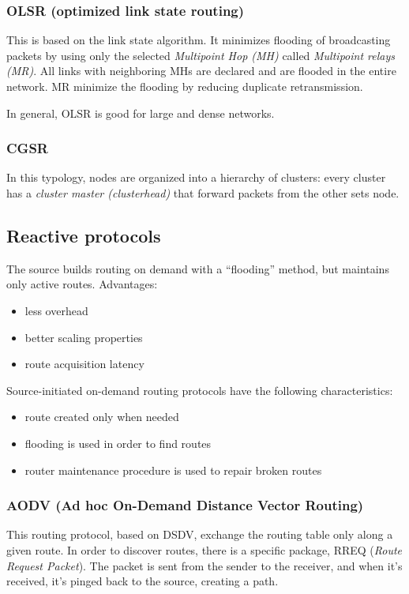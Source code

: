 \subsubsection{OLSR (optimized link state routing)}

This is based on the link state algorithm. It minimizes flooding of broadcasting
packets by using only the selected \textit{Multipoint Hop (MH)} called
\textit{Multipoint relays (MR)}. All links with neighboring MHs are declared and
are flooded in the entire network. MR minimize the flooding by reducing
duplicate retransmission.

In general, OLSR is good for large and dense networks.

\subsubsection{CGSR}

In this typology, nodes are organized into a hierarchy of clusters: every
cluster has a \textit{cluster master (clusterhead)} that forward packets from
the other sets node.

\subsection{Reactive protocols}
The source builds routing on demand with a ``flooding'' method, but maintains
only active routes.
Advantages:
\begin{itemize}
\item less overhead
\item better scaling properties
\item route acquisition latency
\end{itemize}

Source-initiated on-demand routing protocols have the following characteristics:
\begin{itemize}
\item route created only when needed
\item flooding is used in order to find routes
\item router maintenance procedure is used to repair broken routes
\end{itemize}

\subsubsection{AODV (Ad hoc On-Demand Distance Vector Routing)}

This routing protocol, based on DSDV, exchange the routing table only along a
given route. In order to discover routes, there is a specific package, RREQ
(\textit{Route Request Packet}). The packet is sent from the sender to the
receiver, and when it's received, it's pinged back to the source, creating a
path.

